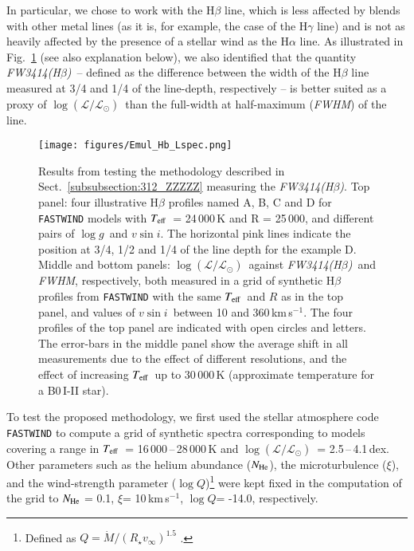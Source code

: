 \documentclass{aa}
\newcommand{\kms}{\mbox{km\,s$^{-1}$}}
\newcommand{\vsini}{\mbox{$v\sin i$}}
\newcommand{\Teff}{\mbox{$T_{\rm eff}$}}
\newcommand{\micro}{$\xi$}
\newcommand{\logg}{\mbox{$\log g$}}
\newcommand{\logq}{\mbox{$\log Q$}}
\newcommand{\logLs}{$\log (\mathcal{L}/\mathcal{L}_{\odot})$}
\newcommand{\fwhb}{\textit{FW3414(H$\beta$)}}
\begin{document}
In particular, we chose to work with the H$\beta$ line, which is less affected by blends with other metal lines (as it is, for example, the case of the H$\gamma$ line) and is not as heavily affected by the presence of a stellar wind as the H$\alpha$ line. As illustrated in Fig.~\ref{fig:Emul_Hb_Lspec} (see also explanation below), we also identified that the quantity \fwhb\ -- defined as the difference between the width of the H$\beta$ line measured at 3/4 and 1/4 of the line-depth, respectively -- is better suited as a proxy of \logLs\ than the full-width at half-maximum (\textit{FWHM}) of the line.


\begin{figure}[!t]
\centering
\texttt{[image: figures/Emul\_Hb\_Lspec.png]}
\caption{Results from testing the methodology described in Sect.~\ref{subsubsection:312_ZZZZZ} measuring the \fwhb. Top panel: four illustrative H$\beta$ profiles named A, B, C and D for {\tt FASTWIND} models with \Teff\ = 24\,000\,K and R = 25\,000, and different pairs of \logg\ and \vsini. The horizontal pink lines indicate the position at 3/4, 1/2 and 1/4 of the line depth for the example D. Middle and bottom panels: \logLs\ against \fwhb\ and \textit{FWHM}, respectively, both measured in a grid of synthetic H$\beta$ profiles from {\tt FASTWIND} with the same \Teff\ and $R$ as in the top panel, and values of \vsini\ between 10 and 360\,\kms. The four profiles of the top panel are indicated with open circles and letters. The error-bars in the middle panel show the average shift in all measurements due to the effect of different resolutions, and the effect of increasing \Teff\ up to 30\,000\,K (approximate temperature for a B0\,I-II star).} 
\label{fig:Emul_Hb_Lspec}
\end{figure}

To test the proposed methodology, we first used the stellar atmosphere code {\tt FASTWIND} \citep{1997A&A...323..488S,2005A&A...435..669P} to compute a grid of synthetic spectra corresponding to models covering a range in \Teff\ = 16\,000\,--\,28\,000\,K and \logLs\ = 2.5\,--\,4.1\,dex. Other parameters such as the helium abundance ($N_{\rm He}$), the microturbulence (\micro), and the wind-strength parameter (\logq)\footnote{Defined as $Q = \dot{M}/(R_{\star}v_{\infty})^{1.5}$ \citep[see][]{1996A&A...305..171P,2005A&A...435..669P}.} were kept fixed in the computation of the grid to $N_{\rm He}$ = 0.1, \micro = 10\,\kms, \logq = -14.0, respectively.
\end{document}
